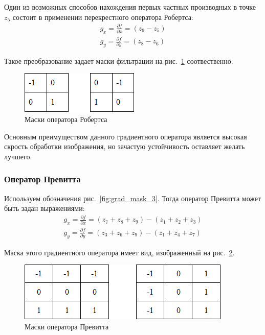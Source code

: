 \documentclass[12pt]{article} %
\begin{document}
Один из возможных способов нахождения первых частных производных в точке~$z_5$ состоит в применении перекрестного оператора Робертса:
\begin{gather}\label{grad_mask_3}
	g_x = \frac{\partial f}{\partial x} = (z_9-z_5)\\
	g_y = \frac{\partial f}{\partial y} = (z_8-z_6)
\end{gather}

Такое преобразование задает маски фильтрации на рис.~\ref{fig:grad_mask_rob} соотвественно.

\begin{figure}[h]
	
	\centering
	
	\includegraphics[width=0.25\linewidth]{grad_mask_rob.jpg}
	
	\caption{Маски оператора Робертса}
	
	\label{fig:grad_mask_rob}
	
\end{figure}

Основным преимуществом данного градиентного оператора является высокая скрость обработки изображения, но зачастую устойчивость оставляет желать лучшего. 

\subsubsection{Оператор Превитта}

Используем обозначения рис.~\ref{fig:grad_mask_3}. Тогда оператор Превитта может быть задан выражениями:
\begin{gather}\label{grad_mask_prev}
	g_x = \frac{\partial f}{\partial x} = (z_7+z_8+z_9)-(z_1+z_2+z_3)\\
	g_y = \frac{\partial f}{\partial y} = (z_3+z_6+z_9)-(z_1+z_4+z_7)
\end{gather}

Маска этого градиентного оператора имеет вид, изображенный на рис.~\ref{fig:grad_mask_prev}.

\begin{figure}[h]
	
	\centering
	
	\includegraphics[width=0.4\linewidth]{grad_mask_prev.jpg}
	
	\caption{Маски оператора Превитта}
	
	\label{fig:grad_mask_prev}
	
\end{figure}
\end{document}

